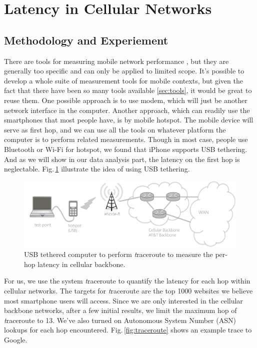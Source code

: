\section{Latency in Cellular Networks}

\subsection{Methodology and Experiement}
\label{sec:methodology}

There are tools for measuring mobile network performance \cite{speedtest, huang2011mobiperf}, but they are generally too specific and can only be applied to limited scope. It's possible to develop a whole suite of measurement tools for mobile contexts, but given the fact that there have been so many tools available \ref{sec:tools}, it would be great to reuse them. One possible approach is to use modem, which will just be another network interface in the computer. Another approach, which can readily use the smartphones that most people have, is by mobile hotspot. The mobile device will serve as first hop, and we can use all the tools on whatever platform the computer is to perform related measurements. Though in most case, people use Bluetooth or Wi-Fi for hotspot, we found that iPhone supports USB tethering. And as we will show in our data analysis part, the latency on the first hop is neglectable. Fig.\,\ref{fig:mobile_networks_method} illustrate the idea of using USB tethering.

\begin{figure}
  \centering
  \includegraphics[width=\linewidth]{../figs/mobile_networks_method.pdf}
  \vspace{-1em}
  \caption{USB tethered computer to perform {\textit traceroute} to measure the per-hop latency in cellular backbone.}
  \label{fig:mobile_networks_method}
\end{figure}

For us, we use the system {\textit traceroute} to quantify the latency for each hop within cellular networks. The targets for {\textit traceroute} are the top 1000 websites we believe most smartphone users will access. Since we are only interested in the cellular backbone networks, after a few initial results, we limit the maximum hop of {\textit traceroute} to 13. We've also turned on Autonomous System Number (ASN) lookups for each hop encountered. Fig.\,\ref{fig:traceroute} shows an example trace to Google.

